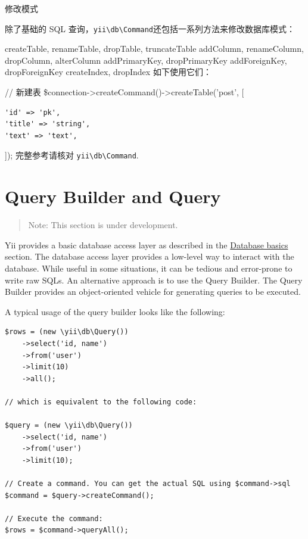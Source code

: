 修改模式

除了基础的 SQL 查询，\texttt{yii{\allowbreak{}\textbackslash}db{\allowbreak{}\textbackslash}Command}还包括一系列方法来修改数据库模式：

createTable, renameTable, dropTable, truncateTable
addColumn, renameColumn, dropColumn, alterColumn
addPrimaryKey, dropPrimaryKey
addForeignKey, dropForeignKey
createIndex, dropIndex
如下使用它们：

// 新建表
\$connection->createCommand()->createTable('post', [

\begin{lstlisting}
'id' => 'pk',
'title' => 'string',
'text' => 'text',
\end{lstlisting}
]);
完整参考请核对 \texttt{yii{\allowbreak{}\textbackslash}db{\allowbreak{}\textbackslash}Command}.



\label{db-query-builder.md}\section{Query Builder and Query}
\begin{quote}Note: This section is under development.

\end{quote}
Yii provides a basic database access layer as described in the \hyperref[database-basics.md]{Database basics} section.
The database access layer provides a low-level way to interact with the database. While useful in some situations,
it can be tedious and error-prone to write raw SQLs. An alternative approach is to use the Query Builder.
The Query Builder provides an object-oriented vehicle for generating queries to be executed.

A typical usage of the query builder looks like the following:

\lstset{language=php}\begin{lstlisting}
$rows = (new \yii\db\Query())
    ->select('id, name')
    ->from('user')
    ->limit(10)
    ->all();

// which is equivalent to the following code:

$query = (new \yii\db\Query())
    ->select('id, name')
    ->from('user')
    ->limit(10);

// Create a command. You can get the actual SQL using $command->sql
$command = $query->createCommand();

// Execute the command:
$rows = $command->queryAll();
\end{lstlisting}
